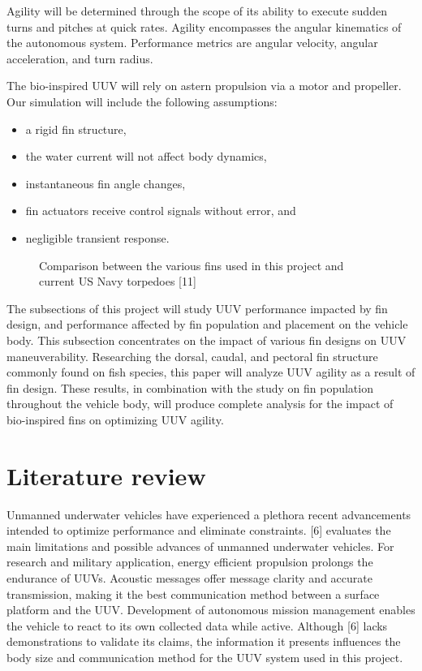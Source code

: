 \documentclass{IEEEtran}
\begin{document}
Agility will be determined through the scope of its ability to execute sudden turns and pitches at quick rates.  Agility encompasses the angular kinematics of the autonomous system.  Performance metrics are angular velocity, angular acceleration, and turn radius.

The bio-inspired UUV will rely on astern propulsion via a motor and propeller. Our simulation will include the following assumptions:
\begin{itemize}
\item a rigid fin structure,  
\item the water current will not affect body dynamics,  
\item instantaneous fin angle changes,
\item fin actuators receive control signals without error, and
\item negligible transient response.
\end{itemize}

\begin{figure}
\caption{Comparison between the various fins used in this project and current US Navy torpedoes [11]}
\label{fig:2}
\end{figure}

The subsections of this project will study UUV performance impacted by fin design, and performance affected by fin population and placement on the vehicle body. This subsection concentrates on the impact of various fin designs on UUV maneuverability. Researching the dorsal, caudal, and pectoral fin structure commonly found on fish species, this paper will analyze UUV agility as a result of fin design.  These results, in combination with the study on fin population throughout the vehicle body, will produce complete analysis for the impact of bio-inspired fins on optimizing UUV agility.  

\section{Literature review}
Unmanned underwater vehicles have experienced a plethora recent advancements intended to optimize performance and eliminate constraints.  [6] evaluates the main limitations and possible advances of unmanned underwater vehicles.  For research and military application, energy efficient propulsion prolongs the endurance of UUVs.  Acoustic messages offer message clarity and accurate transmission, making it the best communication method between a surface platform and the UUV.  Development of autonomous mission management enables the vehicle to react to its own collected data while active.  Although [6] lacks demonstrations to validate its claims, the information it presents influences the body size and communication method for the UUV system used in this project.  
\end{document}
